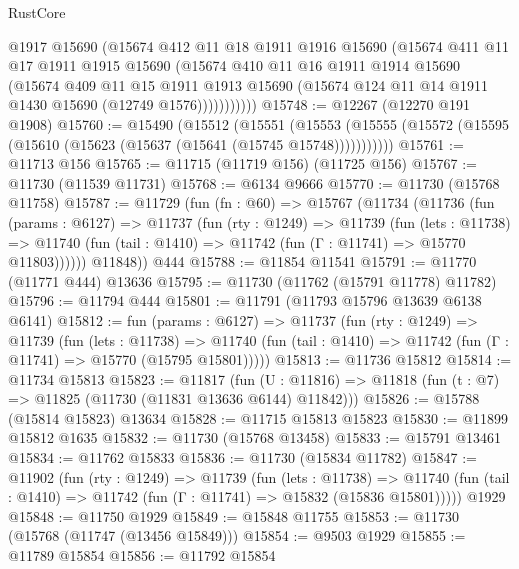 \begin{lexlean}{RustCore}
\begin{coremodule}
              @1917
              @15690
              (@15674
                @412
                @11
                @18
                @1911
                @1916
                @15690
                (@15674
                  @411
                  @11
                  @17
                  @1911
                  @1915
                  @15690
                  (@15674
                    @410
                    @11
                    @16
                    @1911
                    @1914
                    @15690
                    (@15674
                      @409
                      @11
                      @15
                      @1911
                      @1913
                      @15690
                      (@15674 @124 @11 @14 @1911 @1430 @15690 (@12749 @1576)))))))))))
@15748 := @12267 (@12270 @191 @1908)
@15760 := @15490
    (@15512
      (@15551
        (@15553 (@15555 (@15572 (@15595 (@15610 (@15623 (@15637 (@15641 (@15745 @15748)))))))))))
@15761 := @11713 @156
@15765 := @11715 (@11719 @156) (@11725 @156)
@15767 := @11730 (@11539 @11731)
@15768 := @6134 @9666
@15770 := @11730 (@15768 @11758)
@15787 := @11729
    (fun (fn : @60) =>
    @15767
      (@11734
        (@11736
          (fun (params : @6127) =>
          @11737
            (fun (rty : @1249) =>
            @11739
              (fun (lets : @11738) =>
              @11740 (fun (tail : @1410) => @11742 (fun (Γ : @11741) => @15770 @11803))))))
        @11848))
    @444
@15788 := @11854 @11541
@15791 := @11770 (@11771 @444) @13636
@15795 := @11730 (@11762 (@15791 @11778) @11782)
@15796 := @11794 @444
@15801 := @11791 (@11793 @15796 @13639 @6138 @6141)
@15812 := fun (params : @6127) =>
  @11737
    (fun (rty : @1249) =>
    @11739
      (fun (lets : @11738) =>
      @11740 (fun (tail : @1410) => @11742 (fun (Γ : @11741) => @15770 (@15795 @15801)))))
@15813 := @11736 @15812
@15814 := @11734 @15813
@15823 := @11817
    (fun (U : @11816) => @11818 (fun (t : @7) => @11825 (@11730 (@11831 @13636 @6144) @11842)))
@15826 := @15788 (@15814 @15823) @13634
@15828 := @11715 @15813 @15823
@15830 := @11899 @15812 @1635
@15832 := @11730 (@15768 @13458)
@15833 := @15791 @13461
@15834 := @11762 @15833
@15836 := @11730 (@15834 @11782)
@15847 := @11902
    (fun (rty : @1249) =>
    @11739
      (fun (lets : @11738) =>
      @11740 (fun (tail : @1410) => @11742 (fun (Γ : @11741) => @15832 (@15836 @15801)))))
    @1929
@15848 := @11750 @1929
@15849 := @15848 @11755
@15853 := @11730 (@15768 (@11747 (@13456 @15849)))
@15854 := @9503 @1929
@15855 := @11789 @15854
@15856 := @11792 @15854

\end{coremodule}
\end{lexlean}
